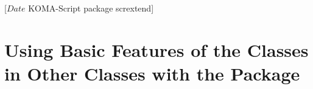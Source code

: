 %
%
%
%
%
%
%
%
% 
%
%
%
%

                 [$Date$
                  KOMA-Script package scrextend]


\chapter[{\KOMAScript{} Features for Other Classes with \Package{scrextend}}]
  {Using Basic Features of the \KOMAScript{} Classes in Other Classes with the
     Package}
\BeginIndexGroup%
%

